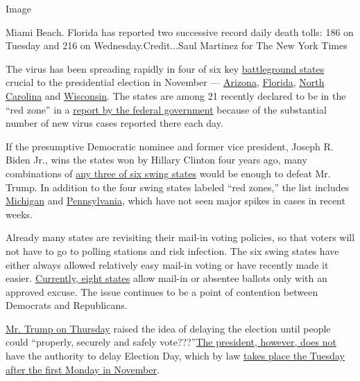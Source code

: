 Image

Miami Beach. Florida has reported two successive record daily death
tolls: 186 on Tuesday and 216 on Wednesday.Credit...Saul Martinez for
The New York Times

The virus has been spreading rapidly in four of six key
\href{https://www.nytimes.com/2020/06/25/upshot/poll-2020-biden-battlegrounds.html}{battleground
states} crucial to the presidential election in November ---
\href{https://www.nytimes.com/interactive/2020/us/arizona-coronavirus-cases.html}{Arizona},
\href{https://www.nytimes.com/interactive/2020/us/florida-coronavirus-cases.html}{Florida},
\href{https://www.nytimes.com/interactive/2020/us/north-carolina-coronavirus-cases.html}{North
Carolina} and
\href{https://www.nytimes.com/interactive/2020/us/wisconsin-coronavirus-cases.html}{Wisconsin}.
The states are among 21 recently declared to be in the ``red zone'' in a
\href{https://www.nytimes.com/interactive/2020/07/28/us/states-report-virus-response-july-26.html}{report
by the federal government} because of the substantial number of new
virus cases reported there each day.

If the presumptive Democratic nominee and former vice president, Joseph
R. Biden Jr., wins the states won by Hillary Clinton four years ago,
many combinations of
\href{https://www.nytimes.com/2020/06/29/us/politics/trump-swing-voters.html}{any
three of six swing states} would be enough to defeat Mr. Trump. In
addition to the four swing states labeled ``red zones,'' the list
includes
\href{https://www.nytimes.com/interactive/2020/us/michigan-coronavirus-cases.html}{Michigan}
and
\href{https://www.nytimes.com/interactive/2020/us/pennsylvania-coronavirus-cases.html}{Pennsylvania},
which have not seen major spikes in cases in recent weeks.

Already many states are revisiting their mail-in voting policies, so
that voters will not have to go to polling stations and risk infection.
The six swing states have either always allowed relatively easy mail-in
voting or have recently made it easier.
\href{https://www.washingtonpost.com/graphics/2020/politics/vote-by-mail-states/}{Currently,
eight states} allow mail-in or absentee ballots only with an approved
excuse. The issue continues to be a point of contention between
Democrats and Republicans.

\href{https://twitter.com/realDonaldTrump/status/1288818160389558273}{Mr.
Trump on Thursday} raised the idea of delaying the election until people
could ``properly, securely and safely
vote???''\href{https://www.nytimes.com/2020/05/12/us/politics/kushner-election-november.html}{The
president, however, does not} have the authority to delay Election Day,
which by law
\href{https://www.loc.gov/law/help/statutes-at-large/28th-congress/session-2/c28s2ch1.pdf}{takes
place the Tuesday after the first Monday in November}.

